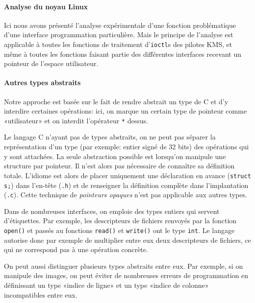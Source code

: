 \paragraph{Analyse du noyau Linux}

Ici nous avons présenté l'analyse expérimentale d'une fonction problématique
d'une interface programmation particulière. Mais le principe de l'analyse est
applicable à toutes les fonctions de traitement d'\texttt{ioctl}s des pilotes
KMS, et même à toutes les fonctions faisant partie des différentes interfaces
recevant un pointeur de l'espace utilisateur.

\paragraph{Autres types abstraits}

Notre approche est basée sur le fait de rendre abstrait un type de C et
d'y interdire certaines opérations: ici, on marque un certain type de pointeur
comme «utilisateur» et on interdit l'opérateur \texttt{*} dessus.

Le langage C n'ayant pas de types abstraits, on ne peut pas séparer la
représentation d'un type (par exemple: entier signé de 32 bits) des opérations
qui y sont attachées. La seule abstraction possible est lorsqu'on manipule une
structure par pointeur. Il n'est alors pas nécessaire de connaître sa définition
totale. L'idiome est alors de placer uniquement une déclaration en avance
(\texttt{struct s;}) dans l'en-tête (\texttt{.h}) et de renseigner la définition
complète dans l'implantation (\texttt{.c}). Cette technique de \emph{pointeurs
opaques} n'est pas applicable aux autres types.

Dans de nombreuses interfaces, on emploie des types entiers qui servent
d'étiquettes. Par exemple, les descripteurs de fichiers renvoyés par la fonction
\verb!open()! et passés au fonctions \verb!read()! et \verb!write()! ont
le type \texttt{int}. Le langage autorise donc par exemple de multiplier entre
eux deux descripteurs de fichiers, ce qui ne correspond pas à une opération
concrète.

On peut aussi distinguer plusieurs types abstraits entre eux. Par exemple, si on
manipule des images, on peut éviter de nombreuses erreurs de programmation en
définissant un type «indice de ligne» et un type «indice de colonne»
incompatibles entre eux.


